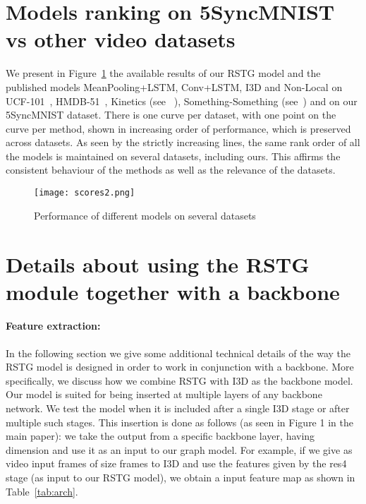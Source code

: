 \documentclass{article}
\def\x{}
\begin{document}
\maketitle


\section{Models ranking on 5SyncMNIST vs other video datasets}
 \label{section:ranking}
    
  We present in Figure~\ref{fig:dataset_correlation} the available results of our RSTG model and the published models MeanPooling+LSTM, Conv+LSTM, I3D and Non-Local  on UCF-101~\cite{soomro2012ucf101},  HMDB-51~\cite{kuehne2011hmdb}, Kinetics (see ~\cite{carreira2017quo}), Something-Something (see~\cite{wang2018videos_gupta2}) and on our 5SyncMNIST dataset. There is one curve per dataset, with one point on the curve per method, shown in increasing order of performance, which is preserved across datasets. As seen by the strictly increasing lines, the same rank order of all the models is maintained on several datasets, including ours. This affirms the consistent behaviour of the methods as well as the relevance of the datasets.
         
         
    \begin{figure}[H]
        \centering
        \texttt{[image: scores2.png]}
        \caption{Performance of different models on several datasets}
        \label{fig:dataset_correlation}
    \end{figure}

\section{Details about using the RSTG module together with a backbone}

\newcommand{\graphiter}{-.1em] \text{Spatial Processing Stage }\end{array}\right]\x3\\ & \\ & \text{Temporal Processing Stage}}



\paragraph{Feature extraction:} In the following section we give some additional technical details of the way the RSTG model is designed in order to work in conjunction with a backbone. More specifically, we discuss how we combine RSTG with I3D as the backbone model. Our model is suited for being inserted at multiple layers of any backbone network. We test the model when it is included after a single I3D stage or after multiple such stages. This insertion is done as follows (as seen in Figure 1 in the main paper): we take the output from a specific backbone layer, having dimension  and use it as an input to our graph model. 
For example, if we give as video input  frames of size  frames to I3D and use the features given by the res4 stage (as input to our RSTG model), we obtain a  input feature map as shown in Table~\ref{tab:arch}.
\end{document}
